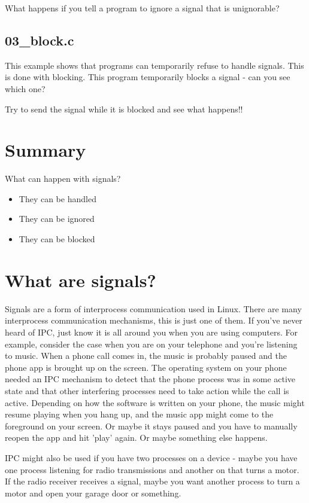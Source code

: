 \documentclass[12pt]{article}
\begin{document}
What happens if you tell a program to ignore a signal that is unignorable?


\subsection{03\_block.c}
This example shows that programs can temporarily refuse to handle signals. This is done with blocking. This program temporarily blocks a signal - can you see which one?

Try to send the signal while it is blocked and see what happens!!



\section{Summary}

What can happen with signals?

\begin{itemize}
\item They can be handled
\item They can be ignored
\item They can be blocked
\end{itemize}

\section{What are signals?}
Signals are a form of interprocess communication used in Linux. There are many interprocess communication mechanisms, this is just one of them. If you've never heard of IPC, just know it is all around you when you are using computers. For example, consider the case when you are on your telephone and you're listening to music. When a phone call comes in, the music is probably paused and the phone app is brought up on the screen. The operating system on your phone needed an IPC mechanism to detect that the phone process was in some active state and that other interfering processes need to take action while the call is active. Depending on how the software is written on your phone, the music might resume playing when you hang up, and the music app might come to the foreground on your screen. Or maybe it stays paused and you have to manually reopen the app and hit 'play' again. Or maybe something else happens.

IPC might also be used if you have two processes on a device - maybe you have one process listening for radio transmissions and another on that turns a motor. If the radio receiver receives a signal, maybe you want another process to turn a motor and open your garage door or something.
\end{document}
